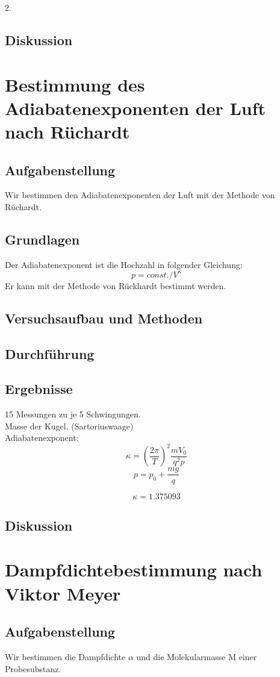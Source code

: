 \documentclass{article}
\begin{document}
2.
\subsection{Diskussion}

\newpage
\section{Bestimmung des Adiabatenexponenten der Luft nach Rüchardt}
\subsection{Aufgabenstellung}
Wir bestimmen den Adiabatenexponenten der Luft mit der Methode von Rüchardt.
\subsection{Grundlagen}
Der Adiabatenexponent ist die Hochzahl in folgender Gleichung:\\
$$p=const./V^{\kappa}$$
Er kann mit der Methode von Rückhardt bestimmt werden. 

\subsection{Versuchsaufbau und Methoden}
\subsection{Durchführung}
\subsection{Ergebnisse}
15 Messungen zu je 5 Schwingungen.\\
Masse der Kugel. (Sartoriuswaage)\\
Adiabatenexponent:
$$\kappa=(\frac{2\pi}{T})^2 \frac{mV_0}{q^2p}$$
$$p=p_0+\frac{mg}{q}$$

$$\boxed{\kappa=1.375093} $$
\subsection{Diskussion}

\newpage
\section{Dampfdichtebestimmung nach Viktor Meyer}
\subsection{Aufgabenstellung}
Wir bestimmen die Dampfdichte $\alpha$ und die Molekularmasse M einer Probesubstanz. 
\end{document}
